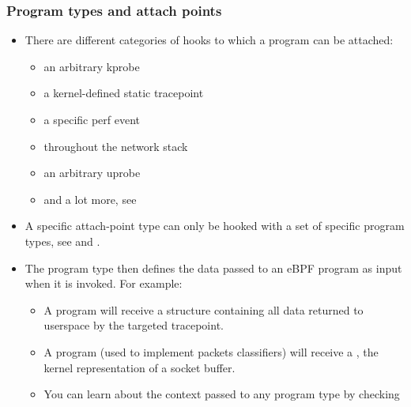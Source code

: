 \begin{frame}[fragile]
  \frametitle{Program types and attach points}
  \begin{itemize}
    \item There are different categories of hooks to which a program can be
    attached:
    \begin{itemize}
      \item an arbitrary kprobe
      \item a kernel-defined static tracepoint
      \item a specific perf event
      \item throughout the network stack
      \item an arbitrary uprobe
      \item and a lot more, see 
    \end{itemize}
    \item A specific attach-point type can only be hooked with a set of
    specific program types, see  and
    .
    \item The program type then defines the data passed to an eBPF program as
    input when it is invoked. For example:
    \begin{itemize}
      \item A  program will receive a structure
      containing all data returned to userspace by the targeted tracepoint.
      \item A  program (used to implement packets
      classifiers) will receive a , the kernel
      representation of a socket buffer.
      \item You can learn about the context passed to any program type by
      checking 
    \end{itemize}
  \end{itemize}
\end{frame}

